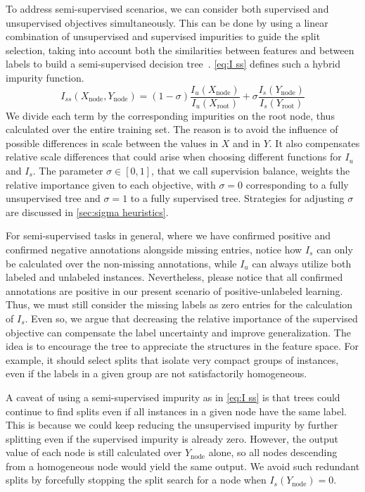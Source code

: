 To address semi-supervised scenarios, we can consider both supervised and unsupervised objectives simultaneously. This can be done by using a linear combination of unsupervised and supervised impurities to guide the split selection, taking into account both the similarities between features and between labels to build a semi-supervised decision tree~\cite{levatic2017semisupervised,adiyeke2022semisupervised,alves2023semisupervised}.
\autoref{eq:I ss} defines such a hybrid impurity function.
%
\begin{equation}
    I_{ss}(X_\text{node}, Y_\text{node}) =
        (1 - \sigma) \frac{I_u(X_\text{node})}{I_u(X_\text{root})}
        + \sigma \frac{I_s(Y_\text{node})}{I_s(Y_\text{root})}
    \label{eq:I ss}
\end{equation}
%
We divide each term by the corresponding impurities on the root node, thus calculated over the entire training set. The reason is to avoid the influence of possible differences in scale between the values in $X$ and in $Y$. It also compensates relative scale differences that could arise when choosing different functions for $I_u$ and $I_s$.
%
The parameter $\sigma \in [0, 1]$, that we call supervision balance,  %
weights the relative importance given to each objective, with $\sigma = 0$ corresponding to a fully unsupervised tree and $\sigma = 1$ to a fully supervised tree. Strategies for adjusting $\sigma$ are discussed in \autoref{sec:sigma heuristics}.

For semi-supervised tasks in general, where we have confirmed positive and confirmed negative annotations alongside missing entries, notice how $I_s$ can only be calculated over the non-missing annotations, while $I_u$ can always utilize both labeled and unlabeled instances.
%
Nevertheless, please notice that all confirmed annotations are positive in our present scenario of positive-unlabeled learning. Thus, we must still consider the missing labels as zero entries for the calculation of $I_s$. Even so, we argue 
that decreasing the relative importance of the supervised objective can compensate the label uncertainty and improve generalization. The idea is to encourage the tree to appreciate the structures in the feature space. For example, it should select splits that isolate very compact groups of instances, even if the labels in a given group are not satisfactorily homogeneous.

A caveat of using a semi-supervised impurity as in \autoref{eq:I ss} is that trees could continue to find splits even if all instances in a given node have the same label. This is because we could keep reducing the unsupervised impurity by further splitting even if the supervised impurity is already zero.
However, the output value of each node is still calculated over $Y_\text{node}$ alone, so all nodes descending from a homogeneous node would yield the same output. We avoid such redundant splits by forcefully stopping the split search for a node when $I_s(Y_\text{node})=0$.

